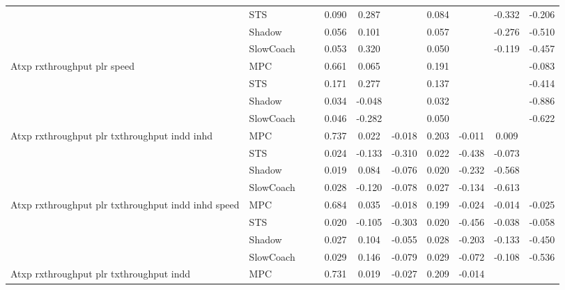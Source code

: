 \begin{tabular}{|l|l|*{9}{c|}}
                              & STS &       &        &     0.090 &  0.287 &     &  0.084 &      &  -0.332 &   -0.206 \\
                              & Shadow &       &        &     0.056 &  0.101 &     &  0.057 &      &  -0.276 &   -0.510 \\
                              & SlowCoach &       &        &     0.053 &  0.320 &     &  0.050 &      &  -0.119 &   -0.457 \\
\midrule
Atxp rxthroughput plr speed    & MPC &       &        &     0.661 &  0.065 &     &  0.191 &      &      &   -0.083 \\
                              & STS &       &        &     0.171 &  0.277 &     &  0.137 &      &      &   -0.414 \\
                              & Shadow &       &        &     0.034 & -0.048 &     &  0.032 &      &      &   -0.886 \\
                              & SlowCoach &       &        &     0.046 & -0.282 &     &  0.050 &      &      &   -0.622 \\
\midrule
Atxp rxthroughput plr txthroughput indd inhd    & MPC &       &        &     0.737 &  0.022 & -0.018 &  0.203 &  -0.011 &   0.009 &       \\
                              & STS &       &        &     0.024 & -0.133 & -0.310 &  0.022 &  -0.438 &  -0.073 &       \\
                              & Shadow &       &        &     0.019 &  0.084 & -0.076 &  0.020 &  -0.232 &  -0.568 &       \\
                              & SlowCoach &       &        &     0.028 & -0.120 & -0.078 &  0.027 &  -0.134 &  -0.613 &       \\
\midrule
Atxp rxthroughput plr txthroughput indd inhd speed    & MPC &       &        &     0.684 &  0.035 & -0.018 &  0.199 &  -0.024 &  -0.014 &   -0.025 \\
                              & STS &       &        &     0.020 & -0.105 & -0.303 &  0.020 &  -0.456 &  -0.038 &   -0.058 \\
                              & Shadow &       &        &     0.027 &  0.104 & -0.055 &  0.028 &  -0.203 &  -0.133 &   -0.450 \\
                              & SlowCoach &       &        &     0.029 &  0.146 & -0.079 &  0.029 &  -0.072 &  -0.108 &   -0.536 \\
\midrule
Atxp rxthroughput plr txthroughput indd    & MPC &       &        &     0.731 &  0.019 & -0.027 &  0.209 &  -0.014 &      &       \\

\end{tabular}
